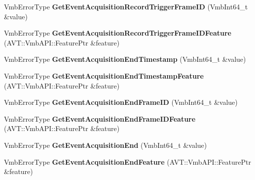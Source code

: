 \begin{DoxyCompactItemize}
\item 
\hypertarget{classMakoCamera_a270da21603edfab2cc749a7191464f37}{Vmb\-Error\-Type {\bfseries Get\-Event\-Acquisition\-Record\-Trigger\-Frame\-I\-D} (Vmb\-Int64\-\_\-t \&value)}\label{classMakoCamera_a270da21603edfab2cc749a7191464f37}

\item 
\hypertarget{classMakoCamera_a51739fe91ac6a48ebcb11f73391958be}{Vmb\-Error\-Type {\bfseries Get\-Event\-Acquisition\-Record\-Trigger\-Frame\-I\-D\-Feature} (A\-V\-T\-::\-Vmb\-A\-P\-I\-::\-Feature\-Ptr \&feature)}\label{classMakoCamera_a51739fe91ac6a48ebcb11f73391958be}

\item 
\hypertarget{classMakoCamera_a4972604573faac7ffea5d91d0a249459}{Vmb\-Error\-Type {\bfseries Get\-Event\-Acquisition\-End\-Timestamp} (Vmb\-Int64\-\_\-t \&value)}\label{classMakoCamera_a4972604573faac7ffea5d91d0a249459}

\item 
\hypertarget{classMakoCamera_a902dd7de33b8883896febf613088528b}{Vmb\-Error\-Type {\bfseries Get\-Event\-Acquisition\-End\-Timestamp\-Feature} (A\-V\-T\-::\-Vmb\-A\-P\-I\-::\-Feature\-Ptr \&feature)}\label{classMakoCamera_a902dd7de33b8883896febf613088528b}

\item 
\hypertarget{classMakoCamera_a432ec16ae135440a2b8e6bfa8503f61a}{Vmb\-Error\-Type {\bfseries Get\-Event\-Acquisition\-End\-Frame\-I\-D} (Vmb\-Int64\-\_\-t \&value)}\label{classMakoCamera_a432ec16ae135440a2b8e6bfa8503f61a}

\item 
\hypertarget{classMakoCamera_a03126c571e7b2a4f9f284efa36ff99e7}{Vmb\-Error\-Type {\bfseries Get\-Event\-Acquisition\-End\-Frame\-I\-D\-Feature} (A\-V\-T\-::\-Vmb\-A\-P\-I\-::\-Feature\-Ptr \&feature)}\label{classMakoCamera_a03126c571e7b2a4f9f284efa36ff99e7}

\item 
\hypertarget{classMakoCamera_a2c9f1d26e3f9a125fd91de8347671f21}{Vmb\-Error\-Type {\bfseries Get\-Event\-Acquisition\-End} (Vmb\-Int64\-\_\-t \&value)}\label{classMakoCamera_a2c9f1d26e3f9a125fd91de8347671f21}

\item 
\hypertarget{classMakoCamera_a4db7648d84870993287cec09c2b9515b}{Vmb\-Error\-Type {\bfseries Get\-Event\-Acquisition\-End\-Feature} (A\-V\-T\-::\-Vmb\-A\-P\-I\-::\-Feature\-Ptr \&feature)}\label{classMakoCamera_a4db7648d84870993287cec09c2b9515b}


\end{DoxyCompactItemize}
